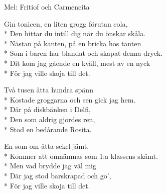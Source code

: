 \begin{SongText}[Rosita]
    \begin{SongInfo}
        Mel: Fritiof och Carmencita
    \end{SongInfo}
    \begin{SongVerse}
        Gin tonicen, en liten grogg förutan cola,\\*%
        Den hittar du intill dig när du önskar skåla.\\*%
        Nästan på kanten, på en bricka hos tanten\\*%
        Som i baren har blandat och skapat denna dryck.\\*%
        Dit kom jag gående en kväll, mest av en nyck\\*%
        För jag ville skoja till det.
    \end{SongVerse}
    \begin{SongVerse}
        Två tusen åtta hundra spänn\\*%
        Kostade groggarna och sen gick jag hem.\\*%
        Där på diskbänken i Delfi,\\*%
        Den som aldrig gjordes ren,\\*%
        Stod en bedårande Rosita.
    \end{SongVerse}
    \begin{SongVerse}
        En som om åtta sekel jämt,\\*%
        Kommer att omnämnas som 1:a klassens skämt.\\*%
        Men vad brydde jag väl mig\\*%
        Där jag stod barskrapad och go’,\\*%
        För jag ville skoja till det.
    \end{SongVerse}
\end{SongText}
